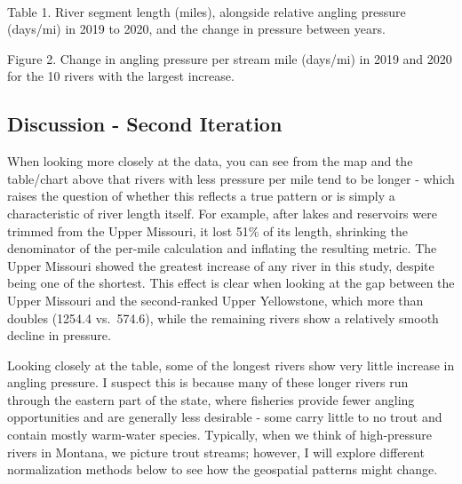 \documentclass[11pt]{article}
\begin{document}
    \begin{center}
    \end{center}
    { \hspace*{\fill} \\}
    
    Table 1. River segment length (miles), alongside relative angling
pressure (days/mi) in 2019 to 2020, and the change in pressure between
years.

Figure 2. Change in angling pressure per stream mile (days/mi) in 2019
and 2020 for the 10 rivers with the largest increase.

    \hypertarget{discussion---second-iteration}{%
\subsection{Discussion - Second
Iteration}\label{discussion---second-iteration}}

When looking more closely at the data, you can see from the map and the
table/chart above that rivers with less pressure per mile tend to be
longer - which raises the question of whether this reflects a true
pattern or is simply a characteristic of river length itself. For
example, after lakes and reservoirs were trimmed from the Upper
Missouri, it lost 51\% of its length, shrinking the denominator of the
per-mile calculation and inflating the resulting metric. The Upper
Missouri showed the greatest increase of any river in this study,
despite being one of the shortest. This effect is clear when looking at
the gap between the Upper Missouri and the second-ranked Upper
Yellowstone, which more than doubles (1254.4 vs.~574.6), while the
remaining rivers show a relatively smooth decline in pressure.

Looking closely at the table, some of the longest rivers show very
little increase in angling pressure. I suspect this is because many of
these longer rivers run through the eastern part of the state, where
fisheries provide fewer angling opportunities and are generally less
desirable - some carry little to no trout and contain mostly warm-water
species. Typically, when we think of high-pressure rivers in Montana, we
picture trout streams; however, I will explore different normalization
methods below to see how the geospatial patterns might change.
\end{document}

